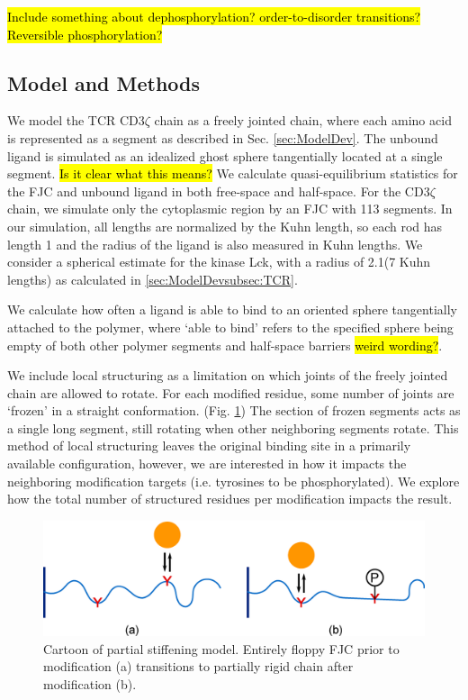 \documentclass[../../AdvancementSummary.tex]{subfiles}
\begin{document}
\hl{Include something about dephosphorylation? order-to-disorder transitions? Reversible phosphorylation?}

\subsection{Model and Methods}

We model the TCR CD3$\zeta$ chain as a freely jointed chain, where each amino acid is represented as a segment as described in Sec. \ref{sec:ModelDev}. The unbound ligand is simulated as an idealized ghost sphere tangentially located at a single segment. \hl{Is it clear what this means?} We calculate quasi-equilibrium statistics for the FJC and unbound ligand in both free-space and half-space. For the CD3$\zeta$ chain, we simulate only the cytoplasmic region by an FJC with 113 segments. In our simulation, all lengths are normalized by the Kuhn length, so each rod has length 1 and the radius of the ligand is also measured in Kuhn lengths. We consider a spherical estimate for the kinase Lck, with a radius of 2.1\nm (7 Kuhn lengths) as calculated in \ref{sec:ModelDevsubsec:TCR}.

We calculate how often a ligand is able to bind to an oriented sphere tangentially attached to the polymer, where `able to bind' refers to the specified sphere being empty of both other polymer segments and half-space barriers \hl{weird wording?}. 

We include local structuring as a limitation on which joints of the freely jointed chain are allowed to rotate. For each modified residue, some number of joints are `frozen' in a straight conformation. (Fig. \ref{fig: StiffeningCartoon}) The section of frozen segments acts as a single long segment, still rotating when other neighboring segments rotate. This method of local structuring leaves the original binding site in a primarily available configuration, however, we are interested in how it impacts the neighboring modification targets (i.e. tyrosines to be phosphorylated). We explore how the total number of structured residues per modification impacts the result. 

\begin{figure}[H]
\begin{center}
    \includegraphics[width=0.8\linewidth]{ResultsFigures/StiffeningDiagram/StiffeningDiagram.eps}
    \caption{Cartoon of partial stiffening model. Entirely floppy FJC prior to modification (a) transitions to partially rigid chain after modification (b). \label{fig: StiffeningCartoon}}
    \end{center}
\end{figure}
\end{document}
